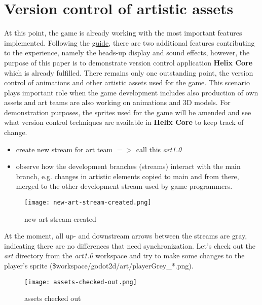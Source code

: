 \section{Version control of artistic assets} \label{case-study-2}
At this point, the game is already working with the most important features implemented. Following the 
\href{https://docs.godotengine.org/en/stable/getting_started/first_2d_game/06.heads_up_display.html}{\color{blue}guide},
there are two additional features contributing to the experience, namely the heads-up display and sound effects, however,
the purpose of this paper is to demonstrate version control application \textbf{Helix Core}\textsuperscript{\texttrademark}
which is already fulfilled. There remains only one outstanding point, the version control of animations and other artistic
assets used for the game. This scenario plays important role when the game development includes also production of own
assets and art teams are also working on animations and 3D models. \hfill \break
For demonstration purposes, the sprites used for the game will be amended and see what version control techniques are 
available in \textbf{Helix Core}\textsuperscript{\texttrademark} to keep track of change.
\begin{itemize}
    \item create new stream for art team {$=>$} call this \textit{art1.0}
    \item observe how the development branches (streams) interact with the main branch, e.g. changes in artistic elements
    copied to main and from there, merged to the other development stream used by game programmers.
\end{itemize}
\begin{figure}[H]
    \centering
    \texttt{[image: new-art-stream-created.png]}
    \setlength{\belowcaptionskip}{-10pt}
    \caption{new art stream created}
    \label{fig:new-art-stream-created}
\end{figure}
At the moment, all up- and downstream arrows between the streams are gray, indicating there are no differences that need
synchronization. Let's check out the \textit{art} directory from the \textit{art1.0} workspace and try to make some
changes to the player's sprite \hfill \break (\$workspace/godot2d/art/playerGrey\_*.png). %
\begin{figure}[H]
    \centering
    \texttt{[image: assets-checked-out.png]}
    \setlength{\belowcaptionskip}{-10pt}
    \caption{assets checked out}
    \label{fig:assets-checked-out}
\end{figure}
